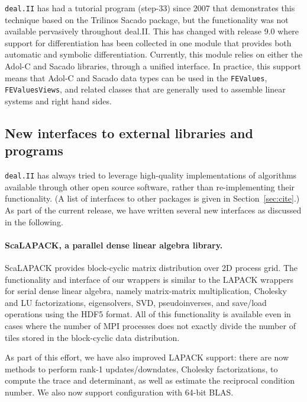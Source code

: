 \documentclass{ansarticle-preprint}
\newcommand{\specialword}[1]{\texttt{#1}}
\newcommand{\dealii}{{\specialword{deal.II}}}
\begin{document}
\dealii{} has had a tutorial program (step-33) since 2007 that
demonstrates this technique based on the Trilinos Sacado package, but
the functionality was not available pervasively throughout
deal.II. This has changed with release 9.0 where support for
differentiation has been collected in one module that provides both
automatic and symbolic differentiation. Currently, this module relies
on either the Adol-C and Sacado libraries, through a unified
interface. In practice, this support means that Adol-C and Sacado data
types can be used in the \texttt{FEValues}, \texttt{FEValuesViews},
and related classes that are generally used to assemble linear systems
and right hand sides.
  

\subsection{New interfaces to external libraries and programs}

\dealii{} has always tried to leverage high-quality implementations of
algorithms available through other open source software, rather than
re-implementing their functionality. (A list of interfaces to other
packages is given in Section~\ref{sec:cite}.) As part of the current
release, we have written several new interfaces as discussed in the following.


\paragraph*{ScaLAPACK, a parallel dense linear algebra library.}
  ScaLAPACK provides block-cyclic matrix distribution over 2D process
  grid. The functionality and interface of our wrappers is similar to
  the LAPACK wrappers for serial dense linear algebra, namely
  matrix-matrix multiplication, Cholesky and LU factorizations,
  eigensolvers, SVD, pseudoinverses, and save/load operations using
  the HDF5 format. All of this functionality is available even in
  cases where the number of MPI processes does not exactly divide the
  number of tiles stored in the block-cyclic data distribution.
  
  As part of this effort, we have also improved LAPACK support: there
  are now methods to perform rank-1 updates/downdates, Cholesky
  factorizations, to compute the trace and determinant, as well as
  estimate the reciprocal condition number. We also now support
  configuration with 64-bit BLAS.
\end{document}
